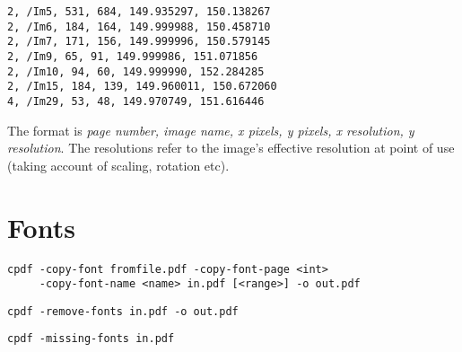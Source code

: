 \documentclass{book}
\begin{document}
  \begin{framed}
{\small\begin{verbatim}2, /Im5, 531, 684, 149.935297, 150.138267
2, /Im6, 184, 164, 149.999988, 150.458710
2, /Im7, 171, 156, 149.999996, 150.579145
2, /Im9, 65, 91, 149.999986, 151.071856
2, /Im10, 94, 60, 149.999990, 152.284285
2, /Im15, 184, 139, 149.960011, 150.672060
4, /Im29, 53, 48, 149.970749, 151.616446\end{verbatim}}
  \end{framed}
  \noindent The format is \textit{page number, image name, x pixels, y pixels, x resolution, y resolution}. The resolutions refer to the image's effective resolution at point of use (taking account of scaling, rotation etc).


\chapter{Fonts}
 {\small \begin{framed}
  \noindent\verb!cpdf -copy-font fromfile.pdf -copy-font-page <int>!\\
  \noindent\verb!     -copy-font-name <name> in.pdf [<range>] -o out.pdf!

  \vspace{1.5mm}
  \noindent\verb!cpdf -remove-fonts in.pdf -o out.pdf!

  \vspace{1.5mm}
  \noindent\verb!cpdf -missing-fonts in.pdf!
  \end{framed}}
\end{document}
